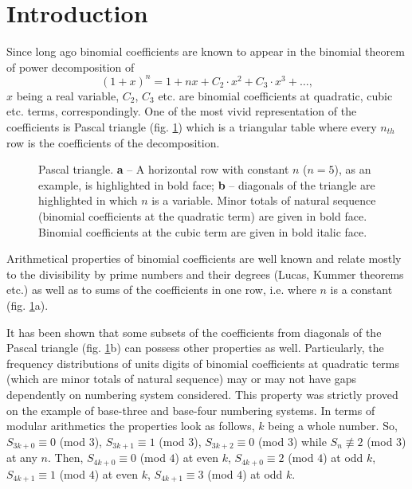 \documentclass[12pt, twoside, leqno]{article}
\theoremstyle{definition}
\numberwithin{equation}{section}
\begin{document}
\section{Introduction}

Since long ago binomial coefficients are known to appear in the binomial theorem of power decomposition of
\begin{equation}
(1 + x)^n = 1 + nx + C_2\cdot x^2 + C_3\cdot x^3 + \dots,
\label{eq:1}
\end{equation}
$x$ being a real variable, $C_2$, $C_3$ etc. are binomial coefficients at quadratic, cubic etc. terms, correspondingly. One of the most vivid representation of the coefficients is Pascal triangle (fig. \ref{fig1}) which is a triangular table where every $n_{th}$ row is the coefficients of the decomposition.

\begin{figure}[tb]
\begin{minipage}[h]{0.49\textwidth}
\end{minipage}
\hfill
\begin{minipage}[h]{0.49\textwidth}
\end{minipage}
\caption{Pascal triangle. \textbf{a} -- A horizontal row with constant $n$ ($n = 5$), as an example, is highlighted in bold face; \textbf{b} -- diagonals of the triangle are highlighted in which $n$ is a variable. Minor totals of natural sequence (binomial coefficients at the quadratic term) are given in bold face. Binomial coefficients at the cubic term are given in bold italic face.}
\label{fig1}
\end{figure}

Arithmetical properties of binomial coefficients are well known and relate mostly to the divisibility by prime numbers and their degrees \cite{Winberg} (Lucas, Kummer theorems etc.) as well as to sums of the coefficients in one row, i.e. where $n$ is a constant (fig. \ref{fig1}a).

It has been shown \cite{Gavrikov} that some subsets of the coefficients from diagonals of the Pascal triangle (fig. \ref{fig1}b) can possess other properties as well. Particularly, the frequency distributions of units digits of binomial coefficients at quadratic terms (which are minor totals of natural sequence) may or may not have gaps dependently on numbering system considered. This property was strictly proved on the example of base-three and base-four numbering systems. In terms of modular arithmetics the properties look as follows, $k$ being a whole number. So, $S_{3k+0} \equiv 0$ (mod $3$), $S_{3k+1} \equiv 1$ (mod $3$), $S_{3k+2} \equiv 0$ (mod $3$) while $S_n \not\equiv 2$ (mod $3$) at any $n$. Then, $S_{4k+0} \equiv 0$ (mod $4$) at even $k$, $S_{4k+0} \equiv 2$ (mod $4$) at odd $k$, $S_{4k+1} \equiv 1$ (mod $4$) at even $k$, $S_{4k+1} \equiv 3$ (mod $4$) at odd $k$. 
\end{document}
